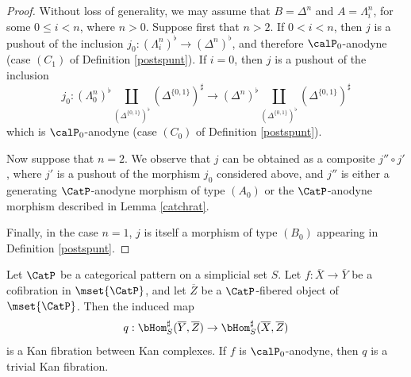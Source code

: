 \begin{proof}
Without loss of generality, we may assume that $B = \Delta^n$ and $A = \Lambda^n_i$, for some
$0 \leq i < n$, where $n >0$. Suppose first that $n > 2$. If $0 < i < n$, then $j$ is a pushout of the inclusion $j_0: ( \Lambda^n_i)^{\flat} \rightarrow (\Delta^n)^{\flat}$, and therefore $\calP_0$-anodyne
(case $(C_1)$ of Definition \ref{postspunt}). If $i = 0$, then $j$ is a pushout of the inclusion
 $$j_0: (\Lambda^n_0)^{\flat} \coprod_{ (\Delta^{ \{0,1\} })^{\flat} } ( \Delta^{ \{0,1\} })^{\sharp}
\rightarrow ( \Delta^n )^{\flat} \coprod_{ ( \Delta^{ \{0,1\} })^{\flat} } ( \Delta^{ \{0,1\} })^{\sharp}$$
which is $\calP_0$-anodyne (case $(C_0)$ of Definition \ref{postspunt}). 


Now suppose that $n=2$. We observe that $j$ can be obtained as a composite $j'' \circ j'$, where
$j'$ is a pushout of the morphism $j_0$ considered above, and $j''$ is either a generating
$\CatP$-anodyne morphism of type $(A_0)$ or the $\CatP$-anodyne morphism described in
Lemma \ref{catchrat}.

Finally, in the case $n=1$, $j$ is itself a morphism of type $(B_0)$ appearing in Definition \ref{postspunt}.
\end{proof}

\begin{proposition}\label{stilk}
Let $\CatP$ be a categorical pattern on a simplicial set $S$. Let 
$f: \overline{X} \rightarrow \overline{Y}$ be a cofibration in $\mset{ \CatP}$, and let
$\overline{Z}$ be a $\CatP$-fibered object of $\mset{ \CatP}$. Then the induced map
$$q: \bHom^{\sharp}_{S}( \overline{Y}, \overline{Z} ) \rightarrow \bHom^{\sharp}_{S}( \overline{X}, \overline{Z} )$$ is a Kan fibration between Kan complexes. If $f$ is $\calP_0$-anodyne, then $q$ is a trivial Kan fibration.
\end{proposition}

